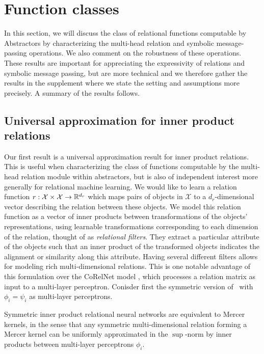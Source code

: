\section{Function classes}
\label{ssec:function_classes_preview}

In this section, we will discuss the class of relational functions computable by Abstractors by characterizing the multi-head relation and symbolic message-passing operations. We also comment on the robustness of these operations. These results are important for appreciating the expressivity of relations and symbolic message passing, but are more technical and we therefore gather the results in the supplement where we state the setting and assumptions more precisely. A summary of the results follows.

\def\rdot{\bigcdot}
\def\F{{\mathfrak{F}}}
\def\MLP{\text{MLP}}

\subsection{Universal approximation for inner product relations}

Our first result is a universal approximation result for inner product relations. This is useful when characterizing the class of functions computable by the multi-head relation module within abstractors, but is also of independent interest more generally for relational machine learning.
We would like to learn a relation function \(r: \mathcal{X} \times \mathcal{X} \to \mathbb{R}^{d_r}\) which maps pairs of objects in \(\mathcal{X}\) to a \(d_r\)-dimensional vector describing the relation between these objects. We model this relation function as a vector of inner products between transformations of the objects' representations,
using learnable transformations corresponding to each dimension of the relation, thought of as \textit{relational filters}. They extract a particular attribute of the objects such that an inner product of the transformed objects indicates the alignment or similarity along this attribute. Having several different filters allows for modeling rich multi-dimensional relations. This is one notable advantage of this formulation over the CoRelNet model \citep{kerg2022neural}, which processes a relation matrix as input to a multi-layer perceptron. Conisder first the symmetric version of~ with $\phi_i = \psi_i$ as multi-layer perceptrons.

\begin{result}
    Symmetric inner product relational neural networks are equivalent to Mercer kernels, in the sense that any symmetric multi-dimensional relation forming a Mercer kernel can be uniformly approximated in the $\sup$-norm by inner products between multi-layer perceptrons $\phi_i$.
\end{result}

